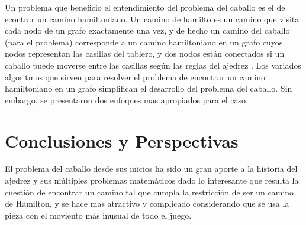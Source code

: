 \documentclass[journal, 10pt]{IEEEtran}
\begin{document}
Un problema que beneficio el entendimiento del problema del caballo es el de econtrar un camino hamiltoniano. Un camino de hamilto es un camino que visita cada nodo de un grafo exactamente una vez, y de hecho un camino del caballo (para el problema) corresponde a un camino hamiltoniano en un grafo cuyos nodos representan las casillas  del tablero, y dos nodos est\'an conectados si un caballo puede moverse entre las casillas seg\'un las reglas del ajedrez \cite{Rosen/2002}. Los variados algoritmos que sirven para resolver el problema de encontrar un camino hamiltoniano en un grafo simplifican el desarrollo del problema del caballo. Sin embargo, se presentaron dos enfoques mas apropiados para el caso.
 




\section{Conclusiones y Perspectivas}
El problema del caballo desde sus inicios ha sido un gran aporte a la historia del ajedrez y sus m\'ultiples problemas matem\'aticos dado lo interesante que resulta la cuesti\'on de encontrar un camino tal que cumpla la restricci\'on de ser un camino de Hamilton, y se hace mas atractivo y complicado considerando que se usa la pieza con el moviento m\'as inusual de todo el juego. 
\end{document}
